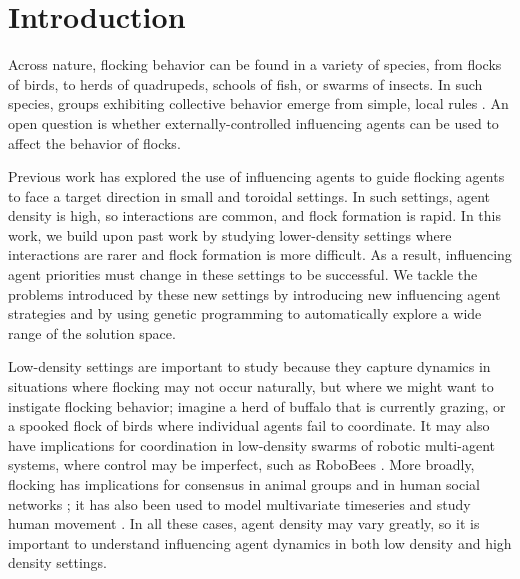 \chapter{Introduction}
\label{introduction}

%


Across nature, flocking behavior can be found in a variety of species, from 
flocks of birds, to herds of quadrupeds, schools of fish, or swarms of insects.
In such species, groups exhibiting collective behavior emerge from simple, 
local rules \citep{sumpter2010collective}.
An open question is whether externally-controlled influencing agents can be 
used to affect the behavior of flocks.

Previous work \cite{genter2013backsearch, genter2013visionstationary, 
genter2014neighborsorientherd, genter2015placement, genter2016facegoalfacecurrent, 
genter201612steplookahead, genterthesis}
has explored the use of influencing agents to guide flocking 
agents to face a target direction in small and toroidal settings.
In such settings, agent density is high, so interactions are common, and flock
formation is rapid.
In this work, we build upon past work by studying lower-density settings where
interactions are rarer and flock formation is more difficult.
As a result, influencing agent priorities must change in these settings to be
successful.
We tackle the problems introduced by these new settings by introducing new
influencing agent strategies and by using genetic programming to automatically
explore a wide range of the solution space.

Low-density settings are important to study because they capture dynamics in
situations where flocking may not occur naturally, but where we might want to
instigate flocking behavior; imagine a herd of buffalo that is currently
grazing, or a spooked flock of birds where individual agents fail to
coordinate.
It may also have implications for coordination in low-density swarms of
robotic multi-agent systems, where control may be imperfect, such as RoboBees
\cite{Chen2017Robobees}.
More broadly, flocking has implications for consensus in animal groups
\cite{Yang2006Consensus, sumpter2008fish, couzin2005} and in human social
networks \cite{liang2012opinion};
it has also been used to model multivariate timeseries and study human
movement \cite{schruben2010multivariate, singham2011agentmovement}.
In all these cases, agent density may vary greatly, so it is important to
understand influencing agent dynamics in both low density and high density
settings.

